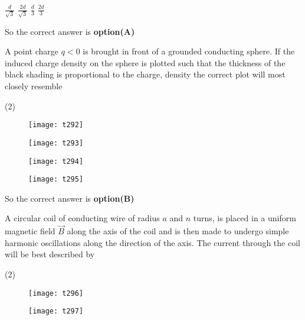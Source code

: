\begin{questions}
\begin{tasks}
	\task[\textbf{A.}] $\frac{d}{\sqrt{3}}$
	\task[\textbf{B.}]   $\frac{2 d}{\sqrt{3}}$
	\task[\textbf{C.}]   $\frac{d}{3}$
	\task[\textbf{D.}]   $\frac{2 d}{3}$
\end{tasks}
\begin{answer}
	So the correct answer is \textbf{option(A)}
\end{answer}
\begin{minipage}{\textwidth}
	\question A point charge $q<0$ is brought in front of a grounded conducting sphere. If the induced charge density on the sphere is plotted such that the thickness of the black shading is proportional to the charge, density the correct plot will most closely resemble
\end{minipage}
\begin{tasks}(2)
	\task[\textbf{A.}] \begin{figure}[H]
		\centering
		\texttt{[image: t292]}
	\end{figure}
	\task[\textbf{B.}] \begin{figure}[H]
		\centering
		\texttt{[image: t293]}
	\end{figure}
	\task[\textbf{C.}] \begin{figure}[H]
		\centering
		\texttt{[image: t294]}
	\end{figure}
	\task[\textbf{D.}] \begin{figure}[H]
		\centering
		\texttt{[image: t295]}
	\end{figure}
\end{tasks}
\begin{answer}
	So the correct answer is \textbf{option(B)}
\end{answer}
\begin{minipage}{\textwidth}
	\question A circular coil of conducting wire of radius $a$ and $n$ turns, is placed in a uniform magnetic field $\vec{B}$ along the axis of the coil and is then made to undergo simple harmonic oscillations along the direction of the axis. The current through the coil will be best described by
\end{minipage}
\begin{tasks}(2)
	\task[\textbf{A.}] \begin{figure}[H]
		\centering
		\texttt{[image: t296]}
	\end{figure}
	\task[\textbf{B.}] \begin{figure}[H]
		\centering
		\texttt{[image: t297]}

\end{figure}
\end{tasks}
\end{questions}
